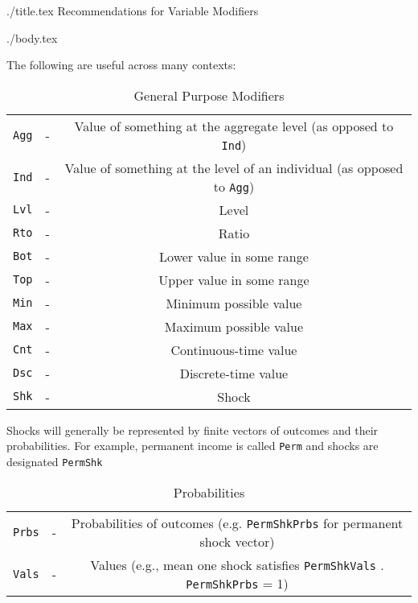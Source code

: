 \documentclass[12pt]{econtex}
\begin{document}
\begin{verbatimwrite}{./title.tex}
Recommendations for Variable Modifiers
\end{verbatimwrite}

\title{}

\date{\today}
\maketitle 

\begin{verbatimwrite}{./body.tex}

The following are useful across many contexts:
\begin{table}[h]
	\centering
	\begin{tabular}{||>{\ttfamily}ccc||} 		
		\hline
   \texttt{Agg} & - & Value of something at the aggregate level (as opposed to \texttt{Ind})
\\ \texttt{Ind} & - & Value of something at the level of an individual (as opposed to \texttt{Agg})
\\ \texttt{Lvl} & - & Level 
\\ \texttt{Rto} & - & Ratio 
\\ \texttt{Bot} & - & Lower value in some range 
\\ \texttt{Top} & - & Upper value in some range 
\\ \texttt{Min} & - & Minimum possible value 
\\ \texttt{Max} & - & Maximum possible value 
\\ \texttt{Cnt} & - & Continuous-time value
\\ \texttt{Dsc} & - & Discrete-time value
\\ \texttt{Shk} & - & Shock 
\\ 	\hline
	\end{tabular}
	\caption{General Purpose Modifiers}
	\label{table:General}
\end{table}	

Shocks will generally be represented by finite vectors of outcomes and their probabilities.  For example, permanent income is called \texttt{Perm} and shocks are designated \texttt{PermShk}
\begin{table}[h]
	\centering
	\begin{tabular}{||>{\ttfamily}ccc||} 		
		\hline
\texttt{Prbs} & - & Probabilities of outcomes (e.g. \texttt{PermShkPrbs} for permanent shock vector) 
\\ \texttt{Vals} & - & Values (e.g., mean one shock satisfies \texttt{PermShkVals} . \texttt{PermShkPrbs} = 1) 
\\ 	\hline
	\end{tabular}
	\caption{Probabilities}
	\label{table:Probabilities}
\end{table}	




\end{verbatimwrite}
\end{document}
